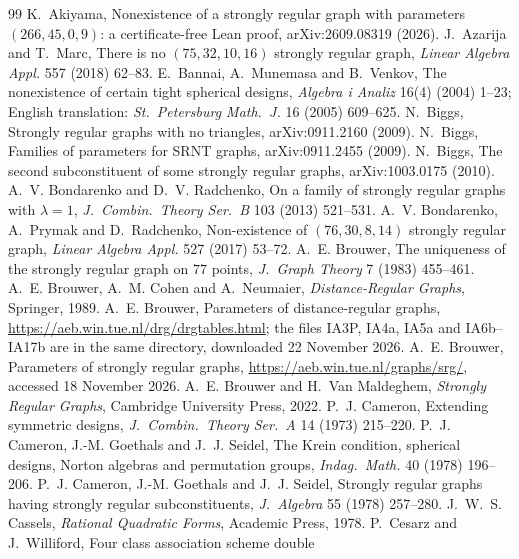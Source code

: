 \documentclass[11pt]{article}
\theoremstyle{definition}
\theoremstyle{remark}
\begin{document}
\FloatBarrier

\begin{thebibliography}{99}
 K.~Akiyama, Nonexistence of a strongly regular graph with
parameters $(266,45,0,9)$: a certificate-free Lean proof, arXiv:2609.08319
(2026).
 J.~Azarija and T.~Marc, There is no $(75,32,10,16)$ strongly
regular graph, \emph{Linear Algebra Appl.} 557 (2018) 62--83.
 E.~Bannai, A.~Munemasa and B.~Venkov, The nonexistence of
certain tight spherical designs, \emph{Algebra i Analiz} 16(4) (2004) 1--23;
English translation: \emph{St.\ Petersburg Math.\ J.} 16 (2005) 609--625.
 N.~Biggs, Strongly regular graphs with no triangles,
arXiv:0911.2160 (2009).
 N.~Biggs, Families of parameters for SRNT graphs,
arXiv:0911.2455 (2009).
 N.~Biggs, The second subconstituent of some strongly regular
graphs, arXiv:1003.0175 (2010).
 A.~V. Bondarenko and D.~V. Radchenko, On a family of strongly
regular graphs with $\lambda=1$, \emph{J.\ Combin.\ Theory Ser.\ B} 103
(2013) 521--531.
 A.~V. Bondarenko, A.~Prymak and D.~Radchenko, Non-existence of
$(76,30,8,14)$ strongly regular graph, \emph{Linear Algebra Appl.} 527 (2017)
53--72.
 A.~E. Brouwer, The uniqueness of the strongly regular graph on
$77$ points, \emph{J.\ Graph Theory} 7 (1983) 455--461.
 A.~E. Brouwer, A.~M. Cohen and A.~Neumaier,
\emph{Distance-Regular Graphs}, Springer, 1989.
 A.~E. Brouwer, Parameters of distance-regular graphs,
\url{https://aeb.win.tue.nl/drg/drgtables.html}; the files IA3P, IA4a, IA5a
and IA6b--IA17b are in the same directory, downloaded 22 November 2026.
 A.~E. Brouwer, Parameters of strongly regular graphs,
\url{https://aeb.win.tue.nl/graphs/srg/}, accessed 18 November 2026.
 A.~E. Brouwer and H.~Van Maldeghem, \emph{Strongly Regular
Graphs}, Cambridge University Press, 2022.
 P.~J. Cameron, Extending symmetric designs, \emph{J.\
Combin.\ Theory Ser.\ A} 14 (1973) 215--220.
 P.~J. Cameron, J.-M. Goethals and J.~J. Seidel, The Krein
condition, spherical designs, Norton algebras and permutation groups,
\emph{Indag.\ Math.} 40 (1978) 196--206.
 P.~J. Cameron, J.-M. Goethals and J.~J. Seidel, Strongly regular
graphs having strongly regular subconstituents, \emph{J.\ Algebra} 55 (1978)
257--280.
 J.~W.~S. Cassels, \emph{Rational Quadratic Forms}, Academic
Press, 1978.
 P.~Cesarz and J.~Williford, Four class association scheme double

\end{thebibliography}
\end{document}
